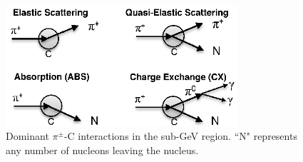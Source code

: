 
\begin{figure}[ht]
\includegraphics[width=86mm]{figures/Figure1_sep_paper_b_w_carbon.eps}
\caption{Dominant $\pi^{\pm}$-C interactions in the sub-GeV region. ``N" represents any number of nucleons leaving the nucleus.}
\label{fig:interactions}
\end{figure}

